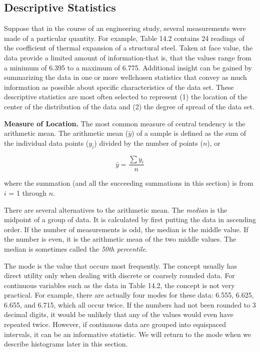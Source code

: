 \documentclass[../main.tex]{subfiles}
\begin{document}
\label{cha:cha_P_14_1_1}
\subsection{Descriptive Statistics}

\noindent Suppose that in the course of an engineering study, several measurements were made of a
particular quantity. For example, Table 14.2 contains 24 readings of the coefficient of thermal expansion of a structural steel. Taken at face value, the data provide a limited amount
of information-that is, that the values range from a minimum of 6.395 to a maximum of
6.775. Additional insight can be gained by summarizing the data in one or more wellchosen statistics that convey as much information as possible about specific characteristics of
the data set. These descriptive statistics are most often selected to represent (1) the location
of the center of the distribution of the data and (2) the degree of spread of the data set.

\noindent \textbf{Measure of Location.} \quad The most common measure of central tendency is the arithmetic
mean. The arithmetic mean ($\bar{y}$) of a sample is defined as the sum of the individual data
points ($y_i$) divided by the number of points ($n$), or

\begin{equation}
	\tag{14.2}
	\bar{y} = \frac{\sum y_i}{n}
\end{equation}

where the summation (and all the succeeding summations in this section) is from $i$ = 1
through $n$.

There are several alternatives to the arithmetic mean. The \textit{median} is the midpoint of a
group of data. It is calculated by first putting the data in ascending order. If the number of
measurements is odd, the median is the middle value. If the number is even, it is the arithmetic mean of the two middle values. The median is sometimes called the \textit{50th percentile}.

The mode is the value that occurs most frequently. The concept usually has direct utility only when dealing with discrete or coarsely rounded data. For continuous variables such
as the data in Table 14.2, the concept is not very practical. For example, there are actually four modes for these data: 6.555, 6.625, 6.655, and 6.715, which all occur twice. If the numbers had not been rounded to 3 decimal digits, it would be unlikely that any of the values
would even have repeated twice. However, if continuous data are grouped into equispaced
intervals, it can be an informative statistic. We will return to the mode when we describe histograms later in this section.
\end{document}
